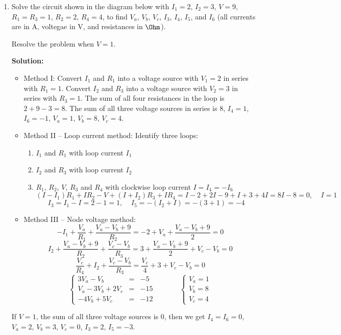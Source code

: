 \begin{enumerate}
\begin{itemize}
  \end{itemize}



\item Solve the circuit shown in the diagram below with $I_1=2$, $I_2=3$, 
  $V=9$, $R_1=R_3=1$, $R_2=2$, $R_4=4$, to find $V_a$, $V_b$, $V_c$, $I_3$, 
  $I_4$, $I_5$, and $I_6$ (all currents are in A, voltegae in V, and resistances
  in $\Ohm$).

  Resolve the problem when $V=1$.


  {\bf Solution:} 
  \begin{itemize}
  \item Method I: Convert $I_1$ and $R_1$ into a voltage source with
    $V_1=2$ in series with $R_1=1$. Convert $I_2$ and $R_3$ into a voltage 
    source with $V_2=3$ in series with $R_3=1$. The sum of all four resistances
    in the loop is $2+9-3=8$. The sum of all three voltage sources in series 
    is 8, $I_4=1$, $I_6=-1$, $V_a=1$, $V_b=8$, $V_c=4$.
  \item Method II -- Loop current method: Identify three loops:
    \begin{enumerate}
      \item $I_1$ and $R_1$ with loop current $I_1$
      \item $I_2$ and $R_3$ with loop current $I_2$
      \item $R_1$, $R_2$, $V$, $R_3$ and $R_4$ with clockwise loop current 
        $I=I_4=-I_6$ 
        \[
        (I-I_1)R_1+IR_2-V+(I+I_2)R_3+IR_4=I-2+2I-9+I+3+4I=8I-8=0,\;\;\;\;I=1
        \]
        \[
        I_3=I_1-I=2-1=1,\;\;\;\;I_5=-(I_2+I)=-(3+1)=-4
        \]
    \end{enumerate}
  \item Method III -- Node voltage method: 
      \[
      -I_1+\frac{V_a}{R_1}+\frac{V_a-V_b+9}{R_2}=-2+V_a+\frac{V_a-V_b+9}{2}=0
      \]
      \[
      I_2+\frac{V_a-V_b+9}{R_2}+\frac{V_c-V_b}{R_3}=3+\frac{V_a-V_b+9}{2}+V_c-V_b=0
      \]
      \[
      \frac{V_c}{R_4}+I_2+\frac{V_c-V_b}{R_3}=\frac{V_c}{4}+3+V_c-V_b=0
      \]
      \[
      \left\{\begin{array}{lll}
      3V_a-V_b&=&-5 \\
      V_a-3V_b+2V_c&=&-15\\
      -4V_b+5V_c&=&-12\end{array}\right.\;\;\;\;\;\;\;\;\;\;\;\;
      \left\{\begin{array}{l}
      V_a=1\\V_b=8\\V_c=4\end{array}\right.
      \]
  \end{itemize}
  If $V=1$, the sum of all three voltage sources is 0, then we get 
  $I_4=I_6=0$, $V_a=2$, $V_b=3$, $V_c=0$, $I_3=2$, $I_5=-3$.


\end{enumerate}
